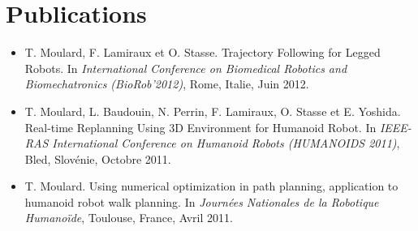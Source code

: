 \chapter*{Publications}
\label{chap:publis}

\begin{itemize}
\item T. Moulard, F. Lamiraux et O. Stasse. Trajectory Following for
  Legged Robots. In \emph{International Conference on Biomedical
    Robotics and Biomechatronics (BioRob'2012)}, Rome, Italie, Juin
  2012.
\item T. Moulard, L. Baudouin, N. Perrin, F. Lamiraux, O. Stasse et
  E. Yoshida. Real-time Replanning Using 3D Environment for Humanoid
  Robot. In \emph{IEEE-RAS International Conference on Humanoid Robots
    (HUMANOIDS 2011)}, Bled, Slovénie, Octobre 2011.
\item T. Moulard. Using numerical optimization in path planning,
  application to humanoid robot walk planning. In \emph{Journées
    Nationales de la Robotique Humanoïde}, Toulouse, France, Avril
  2011.
\end{itemize}
